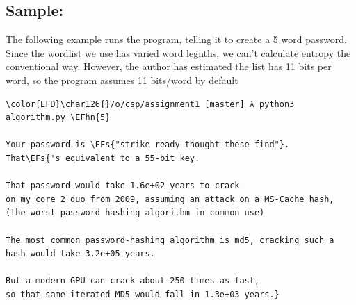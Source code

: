 \documentclass{scrartcl}
\newcommand{\EFs}[1]{\textcolor{EFs}{#1}} %
\newcommand{\EFhn}[1]{\textcolor{EFhn}{\textbf{#1}}} %
\begin{document}
\subsection{Sample:}
\label{sec:org6afd505}
The following example runs the program, telling it to create a 5 word password.
Since the wordlist we use has varied word legnths, we can't calculate entropy
the conventional way. However, the author has estimated the list has 11 bits per
word, so the program assumes 11 bits/word by default
\begin{Code}
\begin{Verbatim}[]
\color{EFD}\char126{}/o/csp/assignment1 [master] λ python3 algorithm.py \EFhn{5}

Your password is \EFs{"strike ready thought these find"}.
That\EFs{'s equivalent to a 55-bit key.

That password would take 1.6e+02 years to crack
on my core 2 duo from 2009, assuming an attack on a MS-Cache hash,
(the worst password hashing algorithm in common use)

The most common password-hashing algorithm is md5, cracking such a hash would take 3.2e+05 years.

But a modern GPU can crack about 250 times as fast,
so that same iterated MD5 would fall in 1.3e+03 years.}
\end{Verbatim}
\end{Code}
\end{document}
